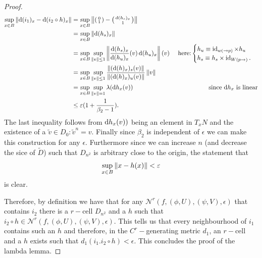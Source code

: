 \begin{proof}
		\begin{align*}
			\sup_{x\in B} \norm{ \diff( i_{1} )_x-\diff (i_2 \circ h )_x} &= \sup_{x\in B} \norm{ \begin{psmallmatrix}
					0 \\
					1
				\end{psmallmatrix}- \begin{psmallmatrix}
					\diff (h_s)_x \\
					1
			\end{psmallmatrix} } \\
			&=\sup _{x\in B} \norm{\diff (h_s)_x } &\\
			&= \sup_{x \in B} \sup_{\norm{v}\leq 1} \norm{\frac{\diff(h_s)_x}{\diff(h_u)_x}(v) \diff(h_u)_x}(v) & \text{ here:} \begin{cases} h_u \equiv  \id_{w(\to p)} \times h_u \\
				h_s \equiv h_s \times \id_{W(p \to)}.
			\end{cases} \\
			&=\sup_{x \in B} \sup_{\norm{v}\leq 1} \frac{\norm{(\diff(h)_x)_s(v)}}{\norm{(\diff(h)_x)_u(v)}}\norm{v}\\
			&= \sup_{x \in B} \sup_{\norm{v} = 1} \lambda(\diff h_x(v)) & \text{since $\diff h_x$ is linear} \\
			& \leq \epsilon(1+\frac{1}{\beta_2-1}).
		\end{align*} The last inequality follows from $\mathop{}\!\mathrm{d} h_x(v))$ being an element in $T_xN$ and the existence of a $\tilde{v} \in D_0:\tilde{v}^n=v$. Finally since $\beta_2$ is independent of $\epsilon$ we can make this construction for any $\epsilon$.
		Furthermore since we can increase $n$ (and decrease the sice of $\tilde{D}$) such that $D_{n^2}$ is arbitrary close to the origin, the statement that 
		\begin{equation*}
			\sup_{x\in B}\left\lVert x-h(x)\right\rVert<\varepsilon 
		\end{equation*} is clear.

		
		 Therefore, by definition we have that for any $\mathcal{N}^r(f,(\phi,U),(\psi,V),\epsilon)$ that contains $i_2$ there is a $r-$cell $D_{n^2}$ and a $h$ such that $i_2 \circ h \in \mathcal{N}^r(f,(\phi,U),(\psi,V),\epsilon)$. This tells us that every neighbourhood of $i_1$ contains such an $h$ and therefore, in the $C^r-$generating metric $d_1$, an $r-$cell and a $h$ exists such that $d_1(i_1.i_2\circ h)<\epsilon.$ This concludes the proof of the lambda lemma.  	
	

\end{proof}
